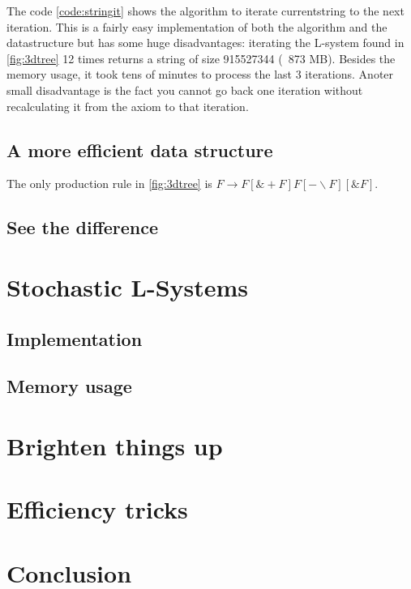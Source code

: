 \documentclass[11pt,a4paper]{article}
\begin{document}
The code \ref{code:stringit} shows the algorithm to iterate currentstring to the next iteration. This is a fairly easy implementation of both the algorithm and the datastructure but has some huge disadvantages: iterating the L-system found in \ref{fig:3dtree} 12 times returns a string of size 915527344 (~873 MB). Besides the memory usage, it took tens of minutes to process the last 3 iterations. Anoter small disadvantage is the fact you cannot go back one iteration without recalculating it from the axiom to that iteration.

\subsection{A more efficient data structure} %

The only production rule in \ref{fig:3dtree} is $F \rightarrow F[\&+F]F[-\backslash F][\&F]$.

\subsection{See the difference} %

\section{Stochastic L-Systems} %
\subsection{Implementation}
\subsection{Memory usage}

\section{Brighten things up} %

\section{Efficiency tricks}

\section{Conclusion}

\newpage
\begin{appendix}
\listoffigures
\end{appendix}
\end{document}
